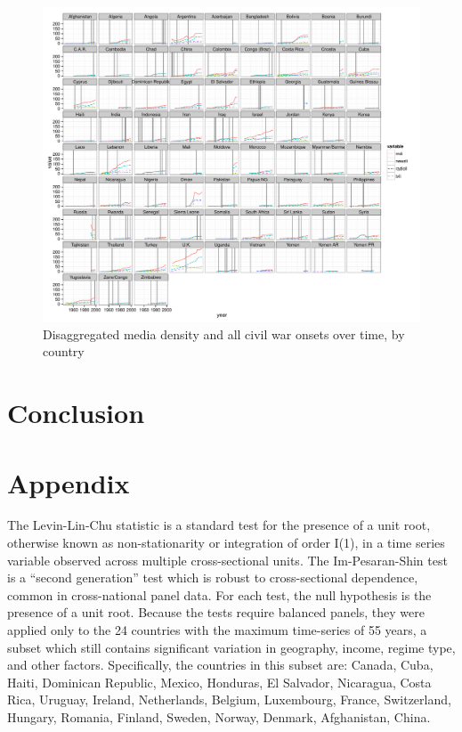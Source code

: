 \documentclass[11pt,article,oneside]{memoir}
\makeatletter
\def\maxwidth{\ifdim\Gin@nat@width>\linewidth\linewidth
\else\Gin@nat@width\fi}
\let\Oldincludegraphics\includegraphics
\renewcommand{\includegraphics}[1]{\Oldincludegraphics[width=\maxwidth]{#1}}
\makeatother
\begin{document}
\begin{figure}[htbp]
\centering
\includegraphics{figure/full_panel_plot.pdf}
\caption{Disaggregated media density and all civil war onsets over time,
by country}
\end{figure}

\section{Conclusion}\label{conclusion}

\section{Appendix}\label{appendix}

The Levin-Lin-Chu statistic is a standard test for the presence of a
unit root, otherwise known as non-stationarity or integration of order
I(1), in a time series variable observed across multiple cross-sectional
units. The Im-Pesaran-Shin test is a ``second generation'' test which is
robust to cross-sectional dependence, common in cross-national panel
data. For each test, the null hypothesis is the presence of a unit root.
Because the tests require balanced panels, they were applied only to the
24 countries with the maximum time-series of 55 years, a subset which
still contains significant variation in geography, income, regime type,
and other factors. Specifically, the countries in this subset are:
Canada, Cuba, Haiti, Dominican Republic, Mexico, Honduras, El Salvador,
Nicaragua, Costa Rica, Uruguay, Ireland, Netherlands, Belgium,
Luxembourg, France, Switzerland, Hungary, Romania, Finland, Sweden,
Norway, Denmark, Afghanistan, China.
\end{document}
